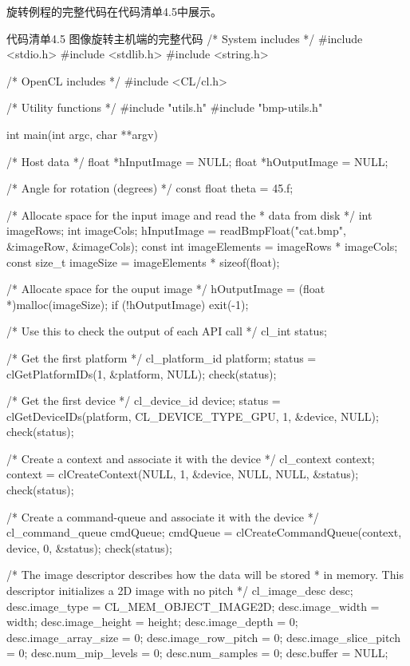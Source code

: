 旋转例程的完整代码在代码清单4.5中展示。

\begin{codeboxt}[cpp]{代码清单4.5 图像旋转主机端的完整代码}
/* System includes */
#include <stdio.h>
#include <stdlib.h>
#include <string.h>

/* OpenCL includes */
#include <CL/cl.h>

/* Utility functions */
#include "utils.h"
#include "bmp-utils.h"

int main(int argc, char **argv)
{
  /* Host data */
  float *hInputImage = NULL;
  float *hOutputImage = NULL;

  /* Angle for rotation (degrees) */
  const float theta = 45.f;

  /* Allocate space for the input image and read the
   * data from disk */
  int imageRows;
  int imageCols;
  hInputImage = readBmpFloat("cat.bmp", &imageRow, &imageCols);
  const int imageElements = imageRows * imageCols;
  const size_t imageSize = imageElements * sizeof(float);

  /* Allocate space for the ouput image */
  hOutputImage = (float *)malloc(imageSize);
  if (!hOutputImage){ exit(-1); }

  /* Use this to check the output of each API call */
  cl_int status;

  /* Get the first platform */
  cl_platform_id platform;
  status = clGetPlatformIDs(1, &platform, NULL);
  check(status);

  /* Get the first device */
  cl_device_id device;
  status = clGetDeviceIDs(platform, CL_DEVICE_TYPE_GPU, 1, &device, NULL);
  check(status);

  /* Create a context and associate it with the device */
  cl_context context;
  context = clCreateContext(NULL, 1, &device, NULL, NULL, &status);
  check(status);

  /* Create a command-queue and associate it with the device */
  cl_command_queue cmdQueue;
  cmdQueue = clCreateCommandQueue(context, device, 0, &status);
  check(status);

  /* The image descriptor describes how the data will be stored
   * in memory. This descriptor initializes a 2D image with no pitch */
  cl_image_desc desc;
  desc.image_type = CL_MEM_OBJECT_IMAGE2D;
  desc.image_width = width;
  desc.image_height = height;
  desc.image_depth = 0;
  desc.image_array_size = 0;
  desc.image_row_pitch = 0;
  desc.image_slice_pitch = 0;
  desc.num_mip_levels = 0;
  desc.num_samples = 0;
  desc.buffer = NULL;

}
\end{codeboxt}
